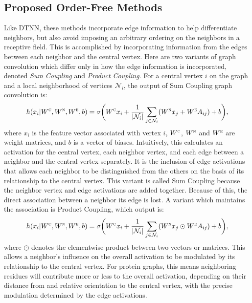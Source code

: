 \subsection{Proposed Order-Free Methods}
Like DTNN, these methods incorporate edge information to help differentiate neighbors, but also avoid imposing an arbitrary ordering on the neighbors in a receptive field.
This is accomplished by incorporating information from the edges between each neighbor and the central vertex.
Here are two variants of graph convolution which differ only in how the edge information is incorporated, denoted \emph{Sum Coupling} and \emph{Product Coupling}.
For a central vertex $i$ on the graph and a local neighborhood of vertices $\mathcal{N}_i$, the output of Sum Coupling graph convolution is:
\begin{equation}
h(x_i | W^\textsc{c}, W^\textsc{n}, W^\textsc{e}, b) = \sigma \bigg( W^{\textsc{c}} x_i + \frac{1}{|\mathcal{N}_i|}\sum_{j \in \mathcal{N}_i} (W^{\textsc{n}} x_j + W^{\textsc{e}} A_{ij}) + b \bigg),
\label{eq:sum_coupling}
\end{equation}
where $x_i$ is the feature vector associated with vertex $i$, $W^\textsc{c}$, $W^\textsc{n}$ and $W^\textsc{e}$ are weight matrices, and $b$ is a vector of biases. 
Intuitively, this calculates an activation for the central vertex, each neighbor vertex, and each edge between a neighbor and the central vertex separately.
It is the inclusion of edge activations that allows each neighbor to be distinguished from the others on the basis of its relationship to the central vertex.
This variant is called Sum Coupling because the neighbor vertex and edge activations are added together.
Because of this, the direct association between a neighbor its edge is lost.
A variant which maintains the association is Product Coupling, which output is:
\begin{equation}
h(x_i | W^\textsc{c}, W^\textsc{n}, W^\textsc{e}, b) = \sigma \bigg( W^{\textsc{c}} x_i + \frac{1}{|\mathcal{N}_i|}\sum_{j \in \mathcal{N}_i} (W^{\textsc{n}} x_j \odot W^{\textsc{e}} A_{ij}) + b \bigg),
\label{eq:prod_coupling}
\end{equation}
where $\odot$ denotes the elementwise product between two vectors or matrices. 
This allows a neighbor's influence on the overall activation to be modulated by its relationship to the central vertex.
For protein graphs, this means neighboring residues will contribute more or less to the overall activation, depending on their distance from and relative orientation to the central vertex, with the precise modulation determined by the edge activations.

